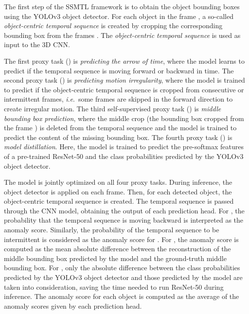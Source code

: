 \documentclass[times,twocolumn,final,authoryear]{elsarticle}
\newcommand{\ie}{\textit{i}.\textit{e}.}
\begin{document}
The first step of the SSMTL framework is to obtain the object bounding boxes using the YOLOv3 \citep{Redmon-arXiv-2018} object detector. For each object in the frame , a so-called \textit{object-centric temporal sequence} is created by cropping the corresponding bounding box from the frames .  The \textit{object-centric temporal sequence} is used as input to the 3D CNN.

The first proxy task () is \textit{predicting the arrow of time}, where the model learns to predict if the temporal sequence is moving forward or backward in time. The second proxy task () is \textit{predicting motion irregularity}, where the model is trained to predict if the object-centric temporal sequence is cropped from consecutive or intermittent frames, \ie~some frames are skipped in the forward direction to create irregular motion. The third self-supervised proxy task () is \textit{middle bounding box prediction}, where the middle crop (the bounding box cropped from the frame ) is deleted from the temporal sequence and the model is trained to predict the content of the missing bounding box. The fourth proxy task () is \textit{model distillation}. Here, the model is trained to predict the pre-softmax features of a pre-trained ResNet-50 \citep{He-CVPR-2016} and the class probabilities predicted by the YOLOv3 \citep{Redmon-arXiv-2018} object detector. 

The model is jointly optimized on all four proxy tasks. During inference, the object detector is applied on each frame. Then, for each detected object, the object-centric temporal sequence is created. The temporal sequence is passed through the CNN model, obtaining the output of each prediction head. For , the probability that the temporal sequence is moving backward is interpreted as the anomaly score. Similarly, the probability of the temporal sequence to be intermittent is considered as the anomaly score for . For , the anomaly score is computed as the mean absolute difference between the reconstruction of the middle bounding box predicted by the model and the ground-truth middle bounding box. For , only the absolute difference between the class probabilities predicted by the YOLOv3 object detector and those predicted by the model are taken into consideration, saving the time needed to run ResNet-50 during inference. The anomaly score for each object is computed as the average of the anomaly scores given by each prediction head.
\end{document}
